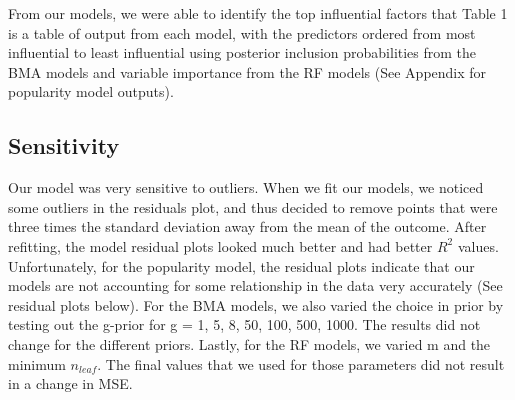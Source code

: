 \documentclass{article}
\begin{document}
From our models, we were able to identify the top influential factors that  Table 1 is a table of output from each model, with the predictors ordered from most influential to least influential using posterior inclusion probabilities from the BMA models and variable importance from the RF models (See Appendix for popularity model outputs).


\subsection{Sensitivity} 
Our model was very sensitive to outliers. When we fit our models, we noticed some outliers in the residuals plot, and thus decided to remove points that were three times the standard deviation away from the mean of the outcome. After refitting, the model residual plots looked much better and had better $R^2$ values. Unfortunately, for the popularity model, the residual plots indicate that our models are not accounting for some relationship in the data very accurately (See residual plots below). For the BMA models, we also varied the choice in prior by testing out the g-prior for g = 1, 5, 8, 50, 100, 500, 1000. The results did not change for the different priors. Lastly, for the RF models, we varied m and the minimum $n_{leaf}$. The final values that we used for those parameters did not result in a change in MSE. 
\end{document}
